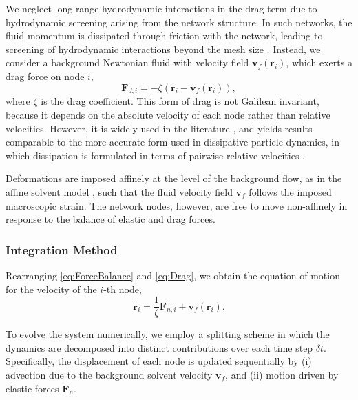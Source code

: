 \documentclass[asymmetricmargins]{library/duthesis}%
\begin{document}
We neglect long-range hydrodynamic interactions in the drag term due to hydrodynamic screening arising from the network structure. In such networks, the fluid momentum is dissipated through friction with the network, leading to screening of hydrodynamic interactions beyond the mesh size \cite{shankar_theory_2002,visscher_dynamic_1994}. Instead, we consider a background Newtonian fluid with velocity field $\bm{v}_f(\bm{r}_i)$, which exerts a drag force on node $i$,
\begin{equation}
    \bm{F}_{d,i} = -\zeta\left(\dot{\bm{r}}_i - \bm{v}_f(\bm{r}_i)\right),
    \label{eq:Drag}
\end{equation}
where $\zeta$ is the drag coefficient. This form of drag is not Galilean invariant, because it depends on the absolute velocity of each node rather than relative velocities. However, it is widely used in the literature \cite{gittes_dynamic_1998,broedersz_modeling_2014,ikeda_unified_2012,puosi_time-dependent_2014,durian_foam_1995,salerno_avalanches_2012,liuDrivingRateDependence2016}, and yields results comparable to the more accurate form used in dissipative particle dynamics, in which dissipation is formulated in terms of pairwise relative velocities \cite{groot_dissipative_1997}. 

Deformations are imposed affinely at the level of the background flow, as in the affine solvent model \cite{durian_foam_1995,lerner_simulations_2013}, such that the fluid velocity field $\bm{v}_f$ follows the imposed macroscopic strain. The network nodes, however, are free to move non-affinely in response to the balance of elastic and drag forces.

\subsubsection{Integration Method} \label{sec:EulerHeun}
Rearranging \cref{eq:ForceBalance} and \cref{eq:Drag}, we obtain the equation of motion for the velocity of the $i$-th node,
\begin{equation*}
    \dot{\bm{r}}_i = \frac{1}{\zeta}\bm{F}_{n,i} + \bm{v}_f(\bm{r}_i).
\end{equation*}

To evolve the system numerically, we employ a splitting scheme in which the dynamics are decomposed into distinct contributions over each time step $\delta t$. Specifically, the displacement of each node is updated sequentially by (i) advection due to the background solvent velocity $\bm{v}_f$, and (ii) motion driven by elastic forces $\bm{F}_n$.
\end{document}
